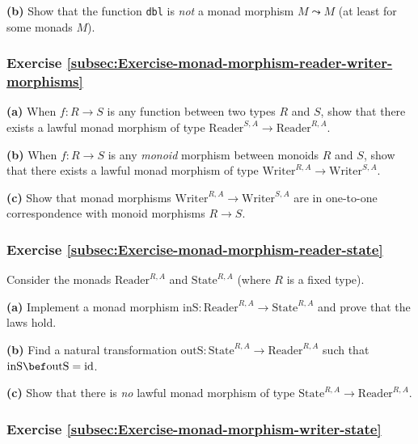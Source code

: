 \textbf{(b)} Show that the function \lstinline!dbl! is \emph{not}
a monad morphism $M\leadsto M$ (at least for some monads $M$).

\subsubsection{Exercise \label{subsec:Exercise-monad-morphism-reader-writer-morphisms}\ref{subsec:Exercise-monad-morphism-reader-writer-morphisms}}

\textbf{(a)} When $f:R\rightarrow S$ is any function between two
types $R$ and $S$, show that there exists a lawful monad morphism
of type $\text{Reader}^{S,A}\rightarrow\text{Reader}^{R,A}$. 

\textbf{(b)} When $f:R\rightarrow S$ is any \emph{monoid} morphism
between monoids $R$ and $S$, show that there exists a lawful monad
morphism of type $\text{Writer}^{R,A}\rightarrow\text{Writer}^{S,A}$.

\textbf{(c)} Show that monad morphisms $\text{Writer}^{R,A}\rightarrow\text{Writer}^{S,A}$
are in one-to-one correspondence with monoid morphisms $R\rightarrow S$.

\subsubsection{Exercise \label{subsec:Exercise-monad-morphism-reader-state}\ref{subsec:Exercise-monad-morphism-reader-state}}

Consider the monads $\text{Reader}^{R,A}$ and $\text{State}^{R,A}$
(where $R$ is a fixed type).

\textbf{(a)} Implement a monad morphism $\text{inS}:\text{Reader}^{R,A}\rightarrow\text{State}^{R,A}$
and prove that the laws hold.

\textbf{(b)} Find a natural transformation $\text{outS}:\text{State}^{R,A}\rightarrow\text{Reader}^{R,A}$
such that $\text{inS}\bef\text{outS}=\text{id}$.

\textbf{(c)} Show that there is \emph{no} lawful monad morphism of
type $\text{State}^{R,A}\rightarrow\text{Reader}^{R,A}$.

\subsubsection{Exercise \label{subsec:Exercise-monad-morphism-writer-state}\ref{subsec:Exercise-monad-morphism-writer-state}}

